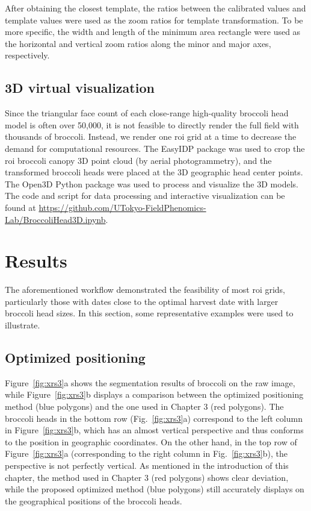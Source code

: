 After obtaining the closest template, the ratios between the calibrated values and template values were used as the zoom ratios for template transformation. To be more specific, the width and length of the minimum area rectangle were used as the horizontal and vertical zoom ratios along the minor and major axes, respectively.

\subsection{3D virtual visualization}

Since the triangular face count of each close-range high-quality broccoli head model is often over 50,000, it is not feasible to directly render the full field with thousands of broccoli. Instead, we render one \gls{roi} grid at a time to decrease the demand for computational resources. The EasyIDP package \citep{wang_easyidp_2021} was used to crop the \gls{roi} broccoli canopy 3D point cloud (by aerial photogrammetry), and the transformed broccoli heads were placed at the 3D geographic head center points. The Open3D Python package \citep[\url{https://github.com/isl-org/Open3D}]{zhou_open3d_2018} was used to process and visualize the 3D models. The code and script for data processing and interactive visualization can be found at  \url{https://github.com/UTokyo-FieldPhenomics-Lab/BroccoliHead3D.ipynb}.

\section{Results}

The aforementioned workflow demonstrated the feasibility of most \gls{roi} grids, particularly those with dates close to the optimal harvest date with larger broccoli head sizes. In this section, some representative examples were used to illustrate.

\subsection{Optimized positioning}

Figure~\ref{fig:xrs3}a shows the segmentation results of broccoli on the raw image, while Figure~\ref{fig:xrs3}b displays a comparison between the optimized positioning method (blue polygons) and the one used in Chapter 3 (red polygons). The broccoli heads in the bottom row (Fig.~\ref{fig:xrs3}a) correspond to the left column in Figure~\ref{fig:xrs3}b, which has an almost vertical perspective and thus conforms to the position in geographic coordinates. On the other hand, in the top row of Figure~\ref{fig:xrs3}a (corresponding to the right column in Fig.~\ref{fig:xrs3}b), the perspective is not perfectly vertical. As mentioned in the introduction of this chapter, the method used in Chapter 3 (red polygons) shows clear deviation, while the proposed optimized method (blue polygons) still accurately displays on the geographical positions of the broccoli heads.

